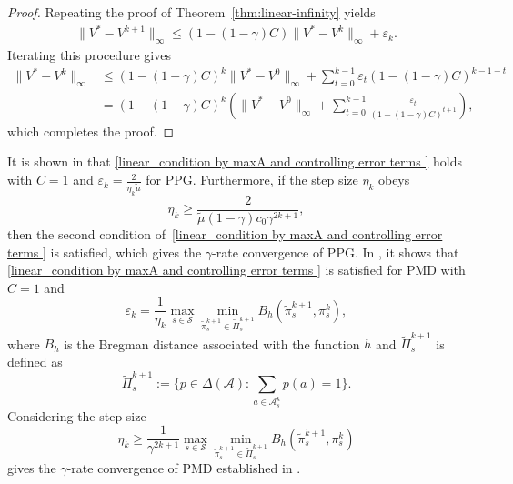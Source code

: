 \begin{proof}
    Repeating the proof of Theorem~\ref{thm:linear-infinity} yields
    \begin{align*}
\|V^*-V^{k+1}\|_\infty\leq \left(1-(1-\gamma)C\right)\|V^*-V^{k}\|_\infty+\varepsilon_k.
\end{align*}
Iterating this procedure gives
\begin{align*}
\|V^*-V^k\|_\infty&\leq \left(1-(1-\gamma)C\right)^{k}\|V^*-V^{0}\|_\infty+\sum_{t=0}^{k-1}\varepsilon_t\left(1-(1-\gamma)C\right)^{k-1-t}\\
&=\left(1-(1-\gamma)C\right)^{k}\left(\|V^*-V^{0}\|_\infty+\sum_{t=0}^{k-1}\frac{\varepsilon_t}{(1-(1-\gamma)C)^{t+1}}\right),
\end{align*}
which completes the proof.
\end{proof}
\begin{remark}
It is shown in \textup{\cite{ppgliu}}  that {\eqref{linear_condition by maxA and controlling error terms }} holds with $C=1$ and $
\varepsilon _k=\frac{2}{\eta _k\tilde{\mu}}$ for PPG. Furthermore, if the step size $\eta_k$ obeys
$$
\eta_k \geq \frac{2}{\tilde{\mu} (1-\gamma) c_0 \gamma ^{2k+1}},
$$
then the second condition of~\eqref{linear_condition by maxA and controlling error terms } is satisfied, which gives the $\gamma$-rate convergence of PPG. In \textup{\cite{Johnson_Pike-Burke_Rebeschini_2023}}, it shows  that \eqref{linear_condition by maxA and controlling error terms } is satisfied for PMD with $C=1$ and 
$$
\varepsilon _k=\frac{1}{\eta _k}\underset{s\in \mathcal{S}}{\max}\underset{\tilde{\pi}_{s}^{k+1}\in \widetilde{\Pi}_{s}^{k+1}}{\min}B_h\left( \tilde{\pi}_{s}^{k+1},\pi _{s}^{k} \right),
$$
where $B_h$ is the Bregman distance associated with the function $h$ and $\tilde{\Pi}^{k+1}_s$ is defined as 
$$
\widetilde{\Pi}_{s}^{k+1}:=\Big\{ p\in \Delta \left( \mathcal{A} \right) :\sum_{a\in \mathcal{A} _{s}^{k}}{p\left( a \right)}=1 \Big\} .
$$
Considering the step size $$
\eta _k\ge \frac{1}{\gamma ^{2k+1}}\underset{s\in \mathcal{S}}{\max}\underset{\tilde{\pi}_{s}^{k+1}\in \widetilde{\Pi}_{s}^{k+1}}{\min}B_h\left( \tilde{\pi}_{s}^{k+1},\pi _{s}^{k} \right)$$
gives the $\gamma$-rate convergence of PMD  established in \textup{\cite{Johnson_Pike-Burke_Rebeschini_2023}}.

\end{remark}